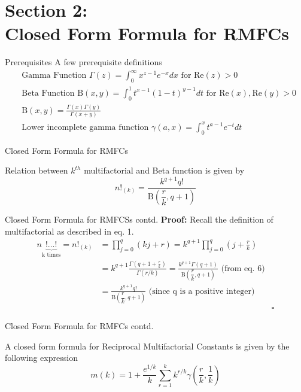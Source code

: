 \documentclass{beamer}
\begin{document}
\section{Section 2: \\Closed Form Formula for RMFCs}
\begin{frame}{Prerequisites}
    A few prerequisite definitions \cite{gamma} \cite{beta} \cite{incompletegamma}
    \begin{align}
    &\text{Gamma Function } \Gamma (z)=\int_0^{\infty}x^{z-1}e^{-x}dx\text{ for } \text{Re}(z)>0\\
    &\text{Beta Function }  \text{B}(x, y)=\int_0^1 t^{x-1}(1-t)^{y-1} dt \text{ for } \text{Re}(x), \text{Re}(y)>0 \\
    &\text{B}(x,y)=\frac{\Gamma(x)\Gamma(y)}{\Gamma(x+y)}\\
    &\text{Lower incomplete gamma function } \gamma (a, x) = \int_0^x t^{a-1} e^{-t} dt
\end{align}
\end{frame}
\begin{frame}{Closed Form Formula for RMFCs}
\begin{lemma}
Relation between $k^{th}$ multifactorial and Beta function is given by $$n!_{(k)}=\frac{k^{q+1}q!}{\mathrm{B}\left (\dfrac{r}{k}, q+1\right )}$$
\end{lemma}
\end{frame}
\begin{frame}{Closed Form Formula for RMFCSs contd.}
\textbf{Proof: }Recall the definition of multifactorial as described in eq. 1.
\begin{align*}
    n\underbrace{!\ldots!}_{\text{k times}}=n!_{(k)}&=\prod_{j=0}^q(kj+r)=k^{q+1}\prod_{j=0}^q\left(j+\frac rk\right)\\
&=k^{q+1}\frac{\Gamma(q+1+\frac{r}{k})}{\Gamma(r/k)}=\frac{k^{q+1}\Gamma(q+1)}{\mathrm{B}\left (\dfrac{r}{k}, q+1\right )} \text{ (from eq. 6)}\\
&=\frac{k^{q+1}q!}{\mathrm{B}\left (\dfrac{r}{k}, q+1\right )} \text{ (since q is a positive integer)}\\
&& \square
\end{align*}
    
\end{frame}
\begin{frame}{Closed Form Formula for RMFCs contd.}
    \begin{theorem}A closed form formula for Reciprocal Multifactorial Constants is given by the following expression \cite{stackproof}
$$m(k)=1+\frac{e^{1/k}}{k}\sum_{r=1}^{k}k^{r/k}\gamma\left ( \frac{r}{k}, \frac{1}{k} \right )$$
\end{theorem}
\end{frame}
\end{document}
